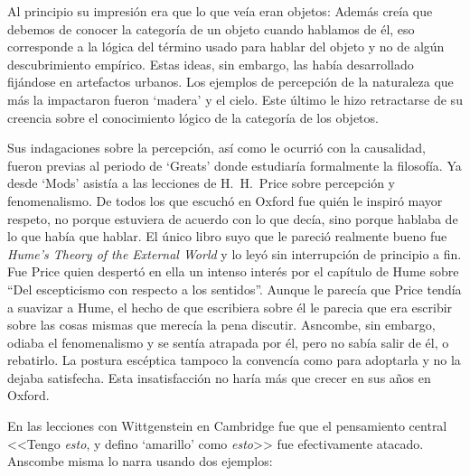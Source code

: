 Al principio su impresión era que lo que veía eran objetos: \autocite[p.~viii]{anscombe1981metaphysicsintro} Además creía que debemos de conocer la categoría de un objeto cuando hablamos de él, eso corresponde a la lógica del término usado para hablar del objeto y no de algún descubrimiento empírico. Estas ideas, sin embargo, las había desarrollado fijándose en artefactos urbanos. Los ejemplos de percepción de la naturaleza que más la impactaron fueron `madera' y el cielo. Este último le hizo retractarse de su creencia sobre el conocimiento lógico de la categoría de los objetos.\autocite[cf.~][p.~viii]{anscombe1981metaphysicsintro}

Sus indagaciones sobre la percepción, así como le ocurrió con la causalidad, fueron previas al periodo de `Greats' donde estudiaría formalmente la filosofía. Ya desde `Mods' asistía a las lecciones de H.~H.~Price sobre percepción y fenomenalismo. De todos los que escuchó en Oxford fue quién le inspiró mayor respeto, no porque estuviera de acuerdo con lo que decía, sino porque hablaba de lo que había que hablar. El único libro suyo que le pareció realmente bueno fue \emph{Hume's Theory of the External World} y lo leyó sin interrupción de principio a fin. Fue Price quien despertó en ella un intenso interés por el capítulo de Hume sobre ``Del escepticismo con respecto a los sentidos''. Aunque le parecía que Price tendía a suavizar a Hume, el hecho de que escribiera sobre él le parecia que era escribir sobre las cosas mismas que merecía la pena discutir. Asncombe, sin embargo, odiaba el fenomenalismo y se sentía atrapada por él, pero no sabía salir de él, o rebatirlo. La postura escéptica tampoco la convencía como para adoptarla y no la dejaba satisfecha. Esta insatisfacción no haría más que crecer en sus años en Oxford. \autocites[cf.~][p.~viii]{anscombe1981metaphysicsintro} [~y~][p.~26]{torralba2005accion}


En las lecciones con Wittgenstein en Cambridge fue que el pensamiento central <<Tengo \emph{esto}, y defino `amarillo' como \emph{esto}>> fue efectivamente atacado. Anscombe misma lo narra usando dos ejemplos:

